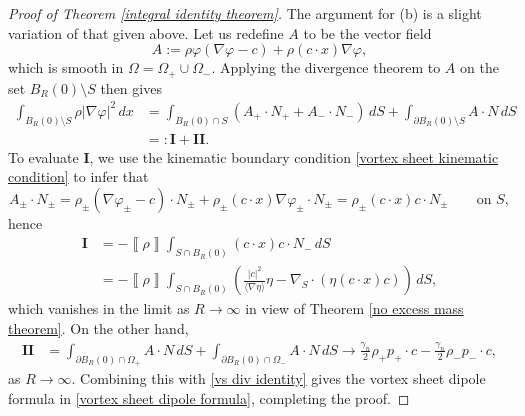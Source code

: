 \documentclass[11pt,reqno]{amsart}
\newcommand{\jbracket}[1]{\langle{#1}\rangle}
\newcommand{\jump}[1]{\left\llbracket{#1}\right\rrbracket}
\theoremstyle{plain}
\theoremstyle{remark}
\numberwithin{equation}{section}
\begin{document}
\begin{proof}[Proof of Theorem \ref{integral identity theorem}]
The argument for (b) is a slight variation of that given above.  Let us redefine $A$ to be the vector field 
\[ A :=   \rho \varphi (\nabla \varphi -c) + \rho (c \cdot x) \nabla \varphi,\]
which is smooth in $\Omega = \Omega_+ \cup \Omega_-$.  Applying the divergence theorem to $A$ on the set $B_R(0) \setminus S$ then gives
\begin{equation}
  \begin{split} \int_{B_R(0) \setminus S} \rho |\nabla \varphi|^2 \, dx &= \int_{B_R(0) \cap S} \left( A_{+} \cdot N_+ + A_{-} \cdot N_- \right) \, dS + \int_{\partial B_R(0) \setminus S} A \cdot N \, dS \\ 
    & =: \mathbf{I} + \mathbf{II}. \end{split} \label{vs div identity} 
\end{equation}
To evaluate $\mathbf{I}$, we use the kinematic boundary condition \eqref{vortex sheet kinematic condition} to infer that 
\[ A_{\pm} \cdot N_\pm = \rho_\pm (\nabla \varphi_\pm -c) \cdot N_\pm + \rho_\pm (c\cdot x) \nabla\varphi_\pm \cdot N_\pm = \rho_\pm (c \cdot x) c \cdot N_\pm \qquad \textrm{on } S,\]
hence 
\begin{align*}
\mathbf{I} &= -\jump{\rho} \int_{S \cap B_R(0)} (c\cdot x) c \cdot N_- \, dS \\
& = -\jump{\rho} \int_{S\cap B_R(0)} \left( \frac{|c|^2}{\jbracket{\nabla \eta}} \eta - \nabla_S \cdot \left( \eta (c \cdot x) c \right) \right) \, dS,
\end{align*}
which vanishes in the limit as $R \to \infty$ in view of Theorem \ref{no excess mass theorem}.  On the other hand, 
\begin{align*}
\mathbf{II} &= \int_{\partial B_R(0) \cap \Omega_+} A \cdot N \, dS + \int_{\partial B_R(0) \cap \Omega_-} A \cdot N \, dS \to \frac{\gamma_n}{2} \rho_+  p_+ \cdot c - \frac{\gamma_n}{2} \rho_-  p_- \cdot c,
\end{align*}
as $R \to \infty$.  Combining this with \eqref{vs div identity} gives the vortex sheet dipole formula in \eqref{vortex sheet dipole formula}, completing the proof.
\end{proof}
\end{document}
